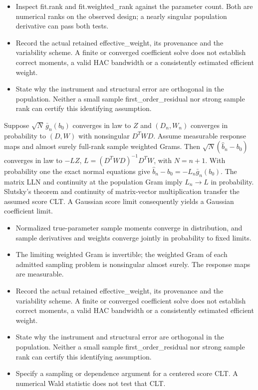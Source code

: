 \expandafter\def\csname statadic@diagnostics@STATADIC-GMM-006\endcsname{\begin{itemize}
\item Inspect fit.rank and fit.weighted\_rank against the parameter count. Both are numerical ranks on the observed design; a nearly singular population derivative can pass both tests.
\item Record the actual retained effective\_weight, its provenance and the variability scheme. A finite or converged coefficient solve does not establish correct moments, a valid HAC bandwidth or a consistently estimated efficient weight.
\item State why the instrument and structural error are orthogonal in the population. Neither a small sample first\_order\_residual nor strong sample rank can certify this identifying assumption.
\end{itemize}}
\expandafter\def\csname statadic@statement@STATADIC-GMM-007\endcsname{Suppose $\sqrt{N}\,\bar g_n(b_0)$ converges in law to $Z$
  and $(D_n,W_n)$ converges in probability to $(D,W)$ with nonsingular
  $D^TWD$. Assume measurable response maps and almost surely full-rank
  sample weighted Grams. Then $\sqrt{N}(\hat b_n-b_0)$ converges in law
  to $-LZ$, $L=(D^TWD)^{-1}D^TW$, with $N=n+1$.}
\expandafter\def\csname statadic@proof@STATADIC-GMM-007\endcsname{With probability one the exact normal equations give
  $\hat b_n-b_0=-L_n\bar g_n(b_0)$. The matrix LLN and continuity at the
  population Gram imply $L_n\to L$ in probability. Slutsky's theorem and
  continuity of matrix-vector multiplication transfer the assumed score CLT.
  A Gaussian score limit consequently yields a Gaussian coefficient limit.}
\expandafter\def\csname statadic@assumptions@STATADIC-GMM-007\endcsname{\begin{itemize}
\item Normalized true-parameter sample moments converge in distribution, and sample derivatives and weights converge jointly in probability to fixed limits.
\item The limiting weighted Gram is invertible; the weighted Gram of each admitted sampling problem is nonsingular almost surely. The response maps are measurable.
\end{itemize}}
\expandafter\def\csname statadic@diagnostics@STATADIC-GMM-007\endcsname{\begin{itemize}
\item Record the actual retained effective\_weight, its provenance and the variability scheme. A finite or converged coefficient solve does not establish correct moments, a valid HAC bandwidth or a consistently estimated efficient weight.
\item State why the instrument and structural error are orthogonal in the population. Neither a small sample first\_order\_residual nor strong sample rank can certify this identifying assumption.
\item Specify a sampling or dependence argument for a centered score CLT. A numerical Wald statistic does not test that CLT.
\end{itemize}}
